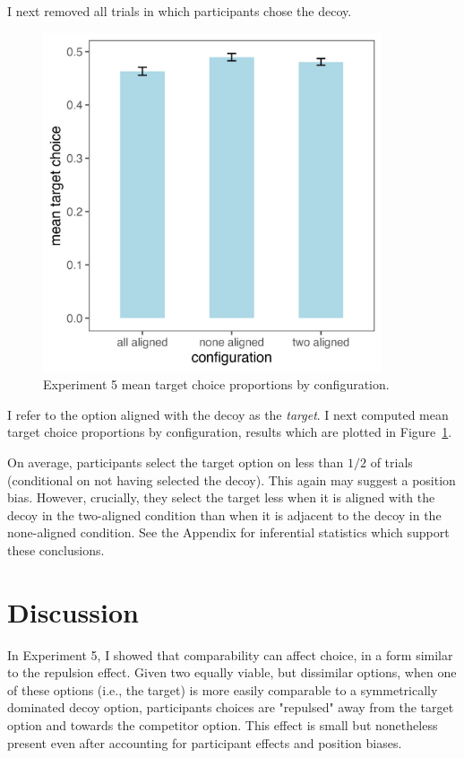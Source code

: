  I next removed all trials in which participants chose the decoy.

\begin{figure}
   \includegraphics[width=100mm]{figures/comparability_crit_target_choice_by_config.jpeg}
   \caption{Experiment 5 mean target choice proportions by configuration.}
   \label{fig:comparability_crit_mean_target_choices}
\end{figure}

I refer to the option aligned with the decoy as the \textit{target}. I next computed mean target choice proportions by configuration, results which are plotted in Figure~\ref{fig:comparability_crit_mean_target_choices}.

On average, participants select the target option on less than $1/2$ of trials (conditional on not having selected the decoy). This again may suggest a position bias. However, crucially, they select the target less when it is aligned with the decoy in the two-aligned condition than when it is adjacent to the decoy in the none-aligned condition. See the Appendix for inferential statistics which support these conclusions.

\section{Discussion}

In Experiment 5, I showed that comparability can affect choice, in a form similar to the repulsion effect. Given two equally viable, but dissimilar options, when one of these options (i.e., the target) is more easily comparable to a symmetrically dominated decoy option, participants choices are "repulsed" away from the target option and towards the competitor option. This effect is small but nonetheless present even after accounting for participant effects and position biases.

